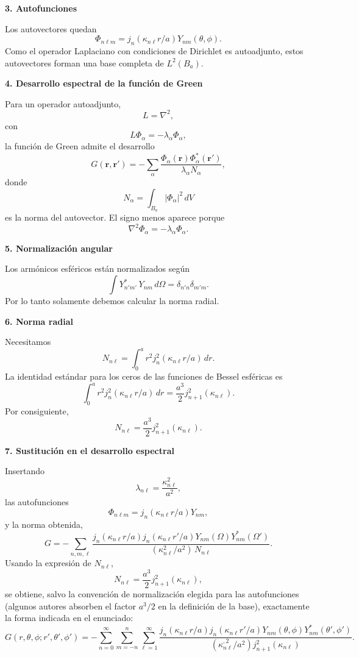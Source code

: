 \documentclass[11pt,spanish]{article}
\begin{document}
{\bf 3. Autofunciones}

Los autovectores quedan
$$
\Phi_{n\ell m}
=
j_n(\kappa_{n\ell}r/a)
Y_{nm}(\theta,\phi).
$$
Como el operador Laplaciano con condiciones de Dirichlet es autoadjunto, estos autovectores forman una base completa de $L^2(B_a)$.

{\bf 4. Desarrollo espectral de la función de Green}

Para un operador autoadjunto,
$$
L=\nabla^2,
$$
con
$$
L\Phi_\alpha
=
-\lambda_\alpha\Phi_\alpha,
$$
la función de Green admite el desarrollo
$$
G(\mathbf r,\mathbf r')
=
-\sum_\alpha
\frac{
\Phi_\alpha(\mathbf r)
\Phi_\alpha^*(\mathbf r')
}{
\lambda_\alpha N_\alpha
},
$$
donde
$$
N_\alpha
=
\int_{B_a}
|\Phi_\alpha|^2\,dV
$$
es la norma del autovector.
El signo menos aparece porque
$$
\nabla^2\Phi_\alpha
=
-\lambda_\alpha\Phi_\alpha.
$$

{\bf 5. Normalización angular}

Los armónicos esféricos están normalizados según
$$
\int
Y_{n'm'}^*\,
Y_{nm}\,
d\Omega
=
\delta_{n'n}\delta_{m'm}.
$$
Por lo tanto solamente debemos calcular la norma radial.

{\bf 6. Norma radial}

Necesitamos
$$
N_{n\ell}
=
\int_0^a
r^2
j_n^2(\kappa_{n\ell}r/a)
\,dr.
$$
La identidad estándar para los ceros de las funciones de Bessel esféricas es
$$
\boxed{
\int_0^a
r^2
j_n^2(\kappa_{n\ell}r/a)
\,dr
=
\frac{a^3}{2}
j_{n+1}^2(\kappa_{n\ell}).
}
$$
Por consiguiente,
$$
N_{n\ell}
=
\frac{a^3}{2}
j_{n+1}^2(\kappa_{n\ell}).
$$

{\bf 7. Sustitución en el desarrollo espectral}

Insertando
$$
\lambda_{n\ell}
=
\frac{\kappa_{n\ell}^2}{a^2},
$$
las autofunciones
$$
\Phi_{n\ell m}
=
j_n(\kappa_{n\ell}r/a)
Y_{nm},
$$
y la norma obtenida,
$$
G=
-
\sum_{n,m,\ell}
\frac{
j_n(\kappa_{n\ell}r/a)
j_n(\kappa_{n\ell}r'/a)
Y_{nm}(\Omega)
Y_{nm}^{*}(\Omega')
}{
(\kappa_{n\ell}^2/a^2)
\,N_{n\ell}
}.
$$
Usando la expresión de $N_{n\ell}$,
$$
N_{n\ell}
=
\frac{a^3}{2}
j_{n+1}^2(\kappa_{n\ell}),
$$
se obtiene, salvo la convención de normalización elegida para las autofunciones (algunos autores absorben el factor $a^3/2$ en la definición de la base), exactamente la forma indicada en el enunciado:
$$
\boxed{
G(r,\theta,\phi;r',\theta',\phi')
=
-
\sum_{n=0}^{\infty}
\sum_{m=-n}^{n}
\sum_{\ell=1}^{\infty}
\frac{
j_n(\kappa_{n\ell}r/a)
j_n(\kappa_{n\ell}r'/a)
Y_{nm}(\theta,\phi)
Y_{nm}^{*}(\theta',\phi')
}{
(\kappa_{n\ell}^{,2}/a^2)
j_{n+1}^2(\kappa_{n\ell})
}.
}
$$
\end{document}
